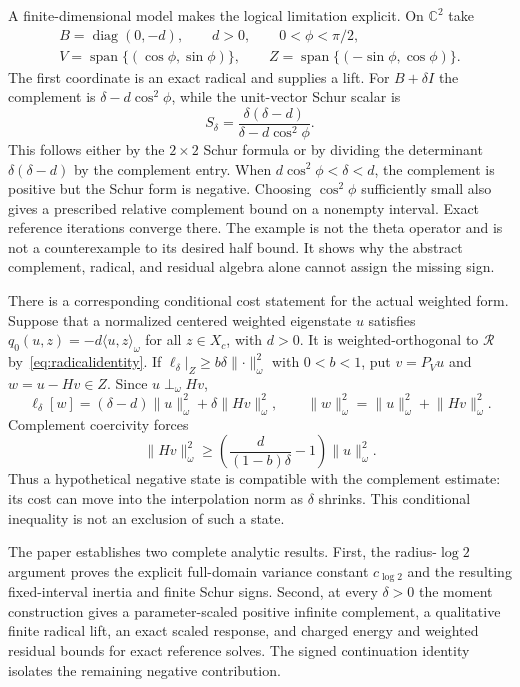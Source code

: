 \documentclass[11pt,a4paper]{article}
\numberwithin{equation}{section}
\theoremstyle{remark}
\newcommand{\C}{\mathbb C}
\newcommand{\ip}[2]{\langle #1,#2\rangle}
\newcommand{\norm}[1]{\lVert #1\rVert}
\newcommand{\Rcal}{\mathcal R}
\begin{document}
A finite-dimensional model makes the logical limitation explicit. On $\C^2$ take
\[
 \begin{gathered}
 B=\operatorname{diag}(0,-d),\qquad d>0,\qquad0<\phi<\pi/2,\\
 V=\operatorname{span}\{(\cos\phi,\sin\phi)\},\qquad
 Z=\operatorname{span}\{(-\sin\phi,\cos\phi)\}.
 \end{gathered}
\]
The first coordinate is an exact radical and supplies a lift. For $B+\delta I$ the complement is $\delta-d\cos^2\phi$, while the unit-vector Schur scalar is
\begin{equation}\label{eq:model}
 S_\delta=\frac{\delta(\delta-d)}{\delta-d\cos^2\phi}.
\end{equation}
This follows either by the $2\times2$ Schur formula or by dividing the determinant $\delta(\delta-d)$ by the complement entry. When
$d\cos^2\phi<\delta<d$, the complement is positive but the Schur form is negative. Choosing $\cos^2\phi$ sufficiently small also gives a prescribed relative complement bound on a nonempty interval. Exact reference iterations converge there. The example is not the theta operator and is not a counterexample to its desired half bound. It shows why the abstract complement, radical, and residual algebra alone cannot assign the missing sign.

There is a corresponding conditional cost statement for the actual weighted form. Suppose that a normalized centered weighted eigenstate $u$ satisfies
$q_0(u,z)=-d\ip uz_\omega$ for all $z\in X_c$, with $d>0$. It is weighted-orthogonal to $\Rcal$ by~\eqref{eq:radicalidentity}. If
$\ell_\delta|_Z\ge b\delta\norm{\cdot}_\omega^2$ with $0<b<1$, put
$v=P_Vu$ and $w=u-Hv\in Z$. Since $u\perp_\omega Hv$,
\[
 \ell_\delta[w]=(\delta-d)\norm u_\omega^2
                   +\delta\norm{Hv}_\omega^2,
 \qquad
 \norm w_\omega^2=\norm u_\omega^2+\norm{Hv}_\omega^2.
\]
Complement coercivity forces
\begin{equation}\label{eq:conditionalcost}
 \norm{Hv}_\omega^2\ge
 \left(\frac{d}{(1-b)\delta}-1\right)\norm u_\omega^2.
\end{equation}
Thus a hypothetical negative state is compatible with the complement estimate: its cost can move into the interpolation norm as $\delta$ shrinks. This conditional inequality is not an exclusion of such a state.

The paper establishes two complete analytic results. First, the radius-$\log2$ argument proves the explicit full-domain variance constant $c_{\log2}$ and the resulting fixed-interval inertia and finite Schur signs. Second, at every $\delta>0$ the moment construction gives a parameter-scaled positive infinite complement, a qualitative finite radical lift, an exact scaled response, and charged energy and weighted residual bounds for exact reference solves. The signed continuation identity isolates the remaining negative contribution.
\end{document}

